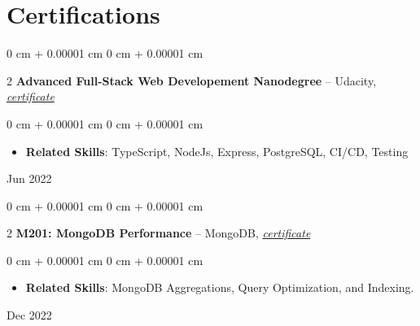 \documentclass[10pt, letterpaper]{article}
\newenvironment{highlights}{
    \begin{itemize}[
        topsep=0.10 cm,
        parsep=0.10 cm,
        partopsep=0pt,
        itemsep=0pt,
        leftmargin=0 cm + 10pt
    ]
}{
    \end{itemize}
} %
\newenvironment{onecolentry}{
    \begin{adjustwidth}{
        0 cm + 0.00001 cm
    }{
        0 cm + 0.00001 cm
    }
}{
    \end{adjustwidth}
} %
\newenvironment{twocolentry}[2][]{
    \onecolentry
    \def\secondColumn{#2}
    \setcolumnwidth{\fill, 4.5 cm}
    \begin{paracol}{2}
}{
    \switchcolumn \raggedleft \secondColumn
    \end{paracol}
    \endonecolentry
} %
\begin{document}
    \vspace{0.05 cm}

    \section{Certifications}
        \begin{twocolentry} {
            Jun 2022
        } \textbf{Advanced Full-Stack Web Developement Nanodegree} -- Udacity, \href{https://www.udacity.com/certificate/FSGKYGKA}{\textit{certificate}}
        \begin{onecolentry}
            \begin{highlights}
                \item \textbf{Related Skills}: TypeScript, NodeJs, Express, PostgreSQL, CI/CD, Testing
            \end{highlights}
        \end{onecolentry}
            
        \end{twocolentry}
        
        \vspace{0.1 cm}

        \begin{twocolentry} {
            Dec 2022
        } \textbf{M201: MongoDB Performance} -- MongoDB, \href{https://learn.mongodb.com/c/8m8_F0jdSJmwhVaylvIzEA}{\textit{certificate}}
        \begin{onecolentry}
            \begin{highlights}
                \item \textbf{Related Skills}: MongoDB Aggregations, Query Optimization, and Indexing.
            \end{highlights}
        \end{onecolentry}
            
        \end{twocolentry}
    \vspace{0.1 cm}
\end{document}
